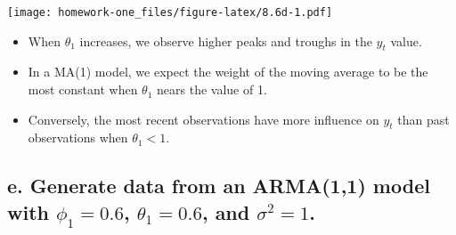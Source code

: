 \documentclass[openany]{book}
\begin{document}
\texttt{[image: homework-one\_files/figure-latex/8.6d-1.pdf]}

\begin{itemize}
\item
  When \(\theta_1\) increases, we observe higher peaks and troughs in the \(y_t\) value.
\item
  In a MA(1) model, we expect the weight of the moving average to be the most constant when \(\theta_1\) nears the value of 1.
\item
  Conversely, the most recent observations have more influence on \(y_t\) than past observations when \(\theta_1<1\).
\end{itemize}

\hypertarget{e.-generate-data-from-an-arma11-model-with-phi_10.6-theta_10.6-and-sigma21.}{%
\subsection{\texorpdfstring{e. Generate data from an ARMA(1,1) model with \(\phi_1=0.6\), \(\theta_1=0.6\), and \(\sigma^2=1\).}{e. Generate data from an ARMA(1,1) model with \textbackslash{}phi\_1=0.6, \textbackslash{}theta\_1=0.6, and \textbackslash{}sigma\^{}2=1.}}\label{e.-generate-data-from-an-arma11-model-with-phi_10.6-theta_10.6-and-sigma21.}}
\end{document}
